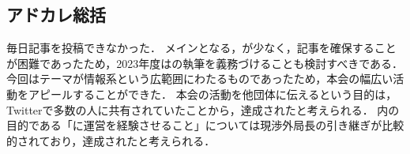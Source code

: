 \subsection*{アドカレ総括}


毎日記事を投稿できなかった．
メインとなる\firstGrade{}，\secondGrade{}が少なく，記事を確保することが困難であったため，2023年度は\thirdGrade{}の執筆を義務づけることも検討すべきである．
今回はテーマが情報系という広範囲にわたるものであったため，本会の幅広い活動をアピールすることができた．
本会の活動を他団体に伝えるという目的は，Twitterで多数の人に共有されていたことから，達成されたと考えられる．
\syogaiDepartment{}内の目的である「\firstGrade{}に運営を経験させること」については現渉外局長の引き継ぎが比較的されており，達成されたと考えられる．
